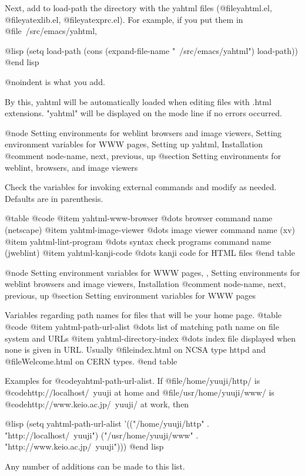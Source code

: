Next, add to load-path the directory with the yahtml files
(@file{yahtml.el}, @file{yatexlib.el}, @file{yatexprc.el}).  For example,
if you put them in @file{~/src/emacs/yahtml},

@lisp
(setq load-path (cons (expand-file-name "~/src/emacs/yahtml") load-path))
@end lisp

@noindent 
is what you add.

By this, yahtml will be automatically loaded when editing files with .html
extensions.  "yahtml" will be displayed on the mode line if no errors
occurred. 

@node Setting environments for weblint browsers and image viewers, Setting environment variables for WWW pages, Setting up yahtml, Installation
@comment  node-name,  next,  previous,  up
@section Setting environments for weblint, browsers, and image viewers

Check the variables for invoking external commands and modify as needed.
Defaults are in parenthesis.

@table @code
@item yahtml-www-browser
        @dots{} browser command name (netscape)
@item yahtml-image-viewer
        @dots{} image viewer command name (xv)
@item yahtml-lint-program
        @dots{} syntax check programs command name (jweblint)
@item yahtml-kanji-code
        @dots{} kanji code for HTML files
@end table

@node Setting environment variables for WWW pages,  , Setting environments for weblint browsers and image viewers, Installation
@comment  node-name,  next,  previous,  up
@section Setting environment variables for WWW pages

Variables regarding path names for files that will be your home page.
@table @code
@item yahtml-path-url-alist
        @dots{} list of matching path name on file system and URLs
@item yahtml-directory-index
        @dots{} index file displayed when none is given in URL.  Usually
        @file{index.html} on NCSA type httpd and @file{Welcome.html} on
        CERN types. 
@end table

Examples for  @code{yahtml-path-url-alist}.  If @file{/home/yuuji/http/}
is @code{http://localhost/~yuuji} at home and @file{/usr/home/yuuji/www/}
is @code{http://www.keio.ac.jp/~yuuji/} at work, then

@lisp
(setq yahtml-path-url-alist
      '(("/home/yuuji/http" . "http://localhost/~yuuji")
        ("/usr/home/yuuji/www" . "http://www.keio.ac.jp/~yuuji")))
@end lisp

Any number of additions can be made to this list.


